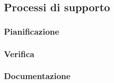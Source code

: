 \subsection{Processi di supporto}
\subsubsection{Pianificazione}
\subsubsection{Verifica}
\subsubsection{Documentazione}